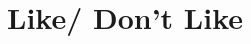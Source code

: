 \documentclass[12pt,portuguese,a4paper]{article}
\begin{document}


\section{Like/ Don't Like}




\end{document}
